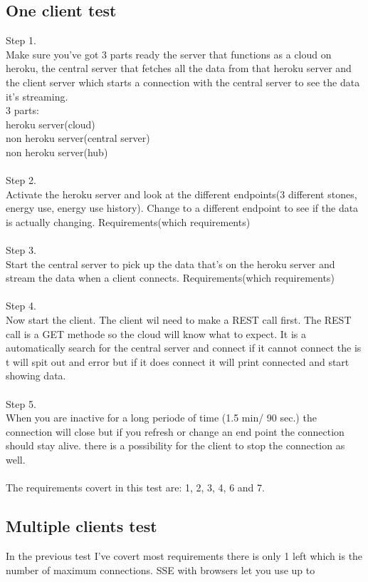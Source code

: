 \documentclass{article}
\begin{document}
\subsection{One client test}\label{client test}
Step 1. \\
Make sure you've got 3 parts ready the server that functions as a cloud on heroku, the central server that fetches all the data from that heroku server and the client server which starts a connection with the central server to see the data it's streaming. \\
3 parts: \\
heroku server(cloud)\\
non heroku server(central server)\\
non heroku server(hub)\\
\\
Step 2.\\
Activate the heroku server and look at the different endpoints(3 different stones, energy use, energy use history). Change to a different endpoint to see if the data is actually changing. Requirements(which requirements)\\
\\
Step 3.\\
Start the central server to pick up the data that's on the heroku server and stream the data when a client connects. Requirements(which requirements)\\
\\
Step 4. \\
Now start the client. The client wil need to make a REST call first. The REST call is a GET methode so the cloud will know what to expect. It is a automatically search for the central server and connect if it cannot connect the is t will spit out and error but if it does connect it will print connected and start showing data.\\
\\
Step 5. \\
When you are inactive for a long periode of time (1.5 min/ 90 sec.) the connection will close but if you refresh or change an end point the connection should stay alive. there is a possibility for the client to stop the connection as well. \\
\\
The requirements covert in this test are: 
1, 2, 3, 4, 6 and 7.

\subsection{Multiple clients test}\label{mclient}
In the previous test I've covert most requirements there is only 1 left which is the number of maximum connections. SSE with browsers let you use up to 
\end{document}
